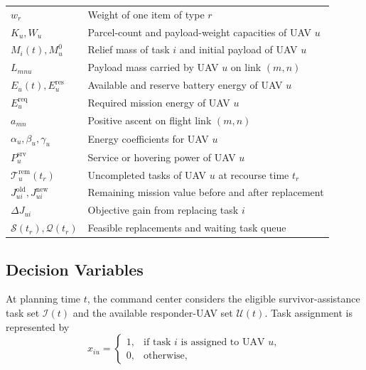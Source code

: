 \documentclass[conference]{IEEEtran}
\begin{document}
\begin{center}
\begin{tabular}{p{}p{}}
$w_r$ & Weight of one item of type $r$\\
$K_u,W_u$ & Parcel-count and payload-weight capacities of UAV $u$\\
$M_i(t),M_u^0$ & Relief mass of task $i$ and initial payload of UAV $u$\\
$L_{mnu}$ & Payload mass carried by UAV $u$ on link $(m,n)$\\
$E_u(t),E_u^{\mathrm{res}}$ & Available and reserve battery energy of UAV $u$\\
$E_u^{\mathrm{req}}$ & Required mission energy of UAV $u$\\
$a_{mn}$ & Positive ascent on flight link $(m,n)$\\
$\alpha_u,\beta_u,\gamma_u$ & Energy coefficients for UAV $u$\\
$P_u^{\mathrm{srv}}$ & Service or hovering power of UAV $u$\\
$\mathcal{T}_u^{\mathrm{rem}}(t_r)$ & Uncompleted tasks of UAV $u$ at recourse time $t_r$\\
$J_{ui}^{\mathrm{old}},J_{ui}^{\mathrm{new}}$ & Remaining mission value before and after replacement\\
$\Delta J_{ui}$ & Objective gain from replacing task $i$\\
$\mathcal{S}(t_r),\mathcal{Q}(t_r)$ & Feasible replacements and waiting task queue\\
\bottomrule
\end{tabular}
\end{center}
\newpage

\subsection{Decision Variables}

At planning time $t$, the command center considers the eligible survivor-assistance task set $\mathcal{I}(t)$ and the available responder-UAV set $\mathcal{U}(t)$. Task assignment is represented by
\begin{equation}
x_{iu}
=
\begin{cases}
1, & \text{if task }i\text{ is assigned to UAV }u,\\
0, & \text{otherwise},
\end{cases}
\end{equation}
\end{document}
